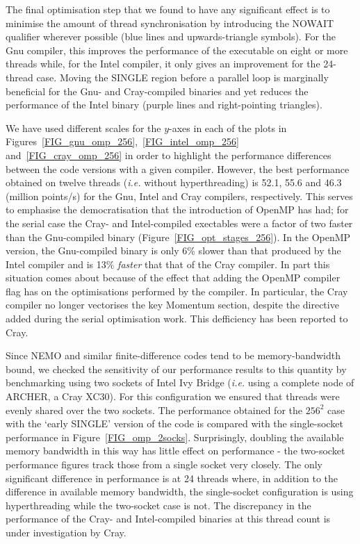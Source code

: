 \documentclass[gmd, manuscript]{copernicus}
\begin{document}
The final optimisation step that we found to have any significant
effect is to minimise the amount of thread synchronisation by
introducing the NOWAIT qualifier wherever possible (blue lines and
upwards-triangle symbols). For the Gnu compiler, this improves the
performance of the executable on eight or more threads while, for the
Intel compiler, it only gives an improvement for the 24-thread
case. Moving the SINGLE region before a parallel loop is marginally
beneficial for the Gnu- and Cray-compiled binaries and yet reduces the
performance of the Intel binary (purple lines and right-pointing
triangles).

We have used different scales for the $y$-axes in each of the plots in
Figures~\ref{FIG_gnu_omp_256},~\ref{FIG_intel_omp_256}
and~\ref{FIG_cray_omp_256} in order to highlight the performance
differences between the code versions with a given compiler. However,
the best performance obtained on twelve threads (\textit{i.e.}  without
hyperthreading) is 52.1, 55.6 and 46.3 (million points/s) for the Gnu,
Intel and Cray compilers, respectively. This serves to emphasise the
democratisation that the introduction of OpenMP has had; for the
serial case the Cray- and Intel-compiled exectables were a factor of
two faster than the Gnu-compiled binary
(Figure~\ref{FIG_opt_stages_256}). In the OpenMP version, the
Gnu-compiled binary is only 6\% slower than that produced by the Intel
compiler and is 13\% \textit{faster} that that of the Cray compiler. In
part this situation comes about because of the effect that adding the
OpenMP compiler flag has on the optimisations performed by the
compiler.  In particular, the Cray compiler no longer vectorises the
key Momentum section, despite the directive added during the serial
optimisation work. This defficiency has been reported to Cray.

Since NEMO and similar finite-difference codes tend to be
memory-bandwidth bound, we checked the sensitivity of our performance
results to this quantity by benchmarking using two sockets of Intel
Ivy Bridge (\textit{i.e.} using a complete node of ARCHER, a Cray
XC30). For this configuration we ensured that threads were evenly
shared over the two sockets. The performance obtained for the $256^2$
case with the `early SINGLE' version of the code is compared with the
single-socket performance in
Figure~\ref{FIG_omp_2socks}. Surprisingly, doubling the available
memory bandwidth in this way has little effect on performance - the
two-socket performance figures track those from a single socket very
closely. The only significant difference in performance is at 24
threads where, in addition to the difference in available memory
bandwidth, the single-socket configuration is using hyperthreading
while the two-socket case is not.  The discrepancy in the performance
of the Cray- and Intel-compiled binaries at this thread count is under
investigation by Cray.
\end{document}
